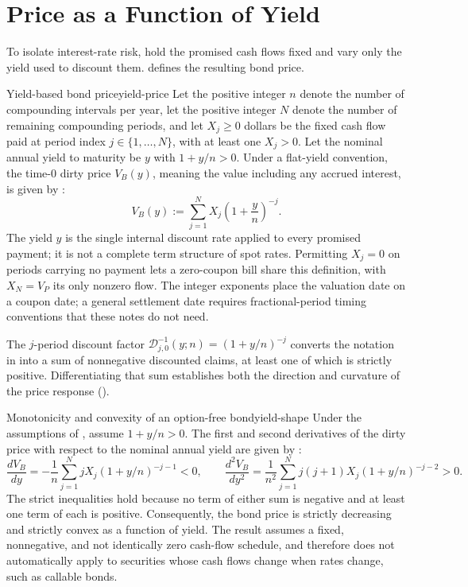 \documentclass[11pt]{article}
\newcommand{\B}{V_{B}}
\begin{document}
\section{Price as a Function of Yield}

To isolate interest-rate risk, hold the promised cash flows fixed and vary only the yield used to discount them.  defines the resulting bond price.

\begin{definition}{Yield-based bond price}{yield-price}
Let the positive integer $n$ denote the number of compounding intervals per year, let the positive integer $N$ denote the number of remaining compounding periods, and let $X_j\ge 0$ dollars be the fixed cash flow paid at period index $j\in\{1,\ldots,N\}$, with at least one $X_j>0$. Let the nominal annual yield to maturity be $y$ with $1+y/n>0$. Under a flat-yield convention, the time-0 dirty price $\B(y)$, meaning the value including any accrued interest, is given by :
\begin{equation}
  \label{eq:yield-price}
  \B(y):=\sum_{j=1}^{N}X_j\left(1+\frac{y}{n}\right)^{-j}.
\end{equation}
The yield $y$ is the single internal discount rate applied to every promised payment; it is not a complete term structure of spot rates. Permitting $X_j=0$ on periods carrying no payment lets a zero-coupon bill share this definition, with $X_N=V_P$ its only nonzero flow. The integer exponents place the valuation date on a coupon date; a general settlement date requires fractional-period timing conventions that these notes do not need.
\end{definition}

The $j$-period discount factor $\mathcal D_{j,0}^{-1}(y;n)=\left(1+y/n\right)^{-j}$ converts the notation in  into a sum of nonnegative discounted claims, at least one of which is strictly positive. Differentiating that sum establishes both the direction and curvature of the price response ().

\begin{theorem}{Monotonicity and convexity of an option-free bond}{yield-shape}
Under the assumptions of , assume $1+y/n>0$. The first and second derivatives of the dirty price with respect to the nominal annual yield are given by :
\begin{equation}
  \label{eq:yield-derivatives}
  \frac{d\B}{dy}
  =-\frac{1}{n}\sum_{j=1}^{N}jX_j\left(1+y/n\right)^{-j-1}<0,
  \qquad
  \frac{d^2\B}{dy^2}
  =\frac{1}{n^2}\sum_{j=1}^{N}j(j+1)X_j\left(1+y/n\right)^{-j-2}>0.
\end{equation}
The strict inequalities hold because no term of either sum is negative and at least one term of each is positive. Consequently, the bond price is strictly decreasing and strictly convex as a function of yield. The result assumes a fixed, nonnegative, and not identically zero cash-flow schedule, and therefore does not automatically apply to securities whose cash flows change when rates change, such as callable bonds.
\end{theorem}
\end{document}
